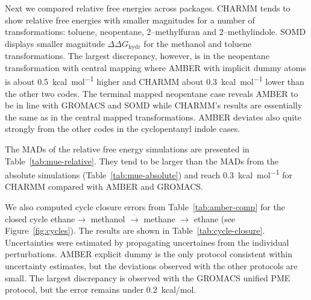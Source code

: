 \documentclass[journal=jctcce,manuscript=article]{achemso}
\begin{document}
Next we compared relative free energies across packages.
CHARMM tends to show relative free energies with smaller magnitudes for a number of transformations: toluene, neopentane, 2--methylfuran and 2--methylindole. SOMD displays smaller magnitude $\Delta\Delta G_{\mathrm{hydr}}$ for the methanol and toluene transformations.  The largest discrepancy, however, is in the neopentane transformation with central mapping where AMBER with implicit dummy atoms is about \SI{0.5}{kcal.mol^{-1}} higher and CHARMM about \SI{0.3}{kcal.mol^{-1}} lower than the other two codes.  The
terminal mapped neopentane case reveals AMBER to be in line with GROMACS and SOMD while CHARMM's results are essentially the same as in the central mapped transformations.  AMBER deviates also quite strongly from the other codes in the cyclopentanyl indole cases.

The MADs of the relative free energy simulations are presented in
Table~\ref{tab:mue-relative}.  They tend to be larger than the MADs from
the absolute simulations (Table~\ref{tab:mue-absolute}) and reach
\SI{0.3}{kcal.mol^{-1}} for CHARMM compared with AMBER and GROMACS.

\begin{table}[]
  \begin{minipage}{\linewidth}
    \caption{MAD (in \si{kcal.mol^{-1}}) comparing relative free energies from
      relative simulations between SOMD, GROMACS, AMBER and
      CHARMM.}\label{tab:mue-relative}
  \end{minipage}
\end{table}
We also computed cycle closure errors from Table~\ref{tab:amber-comp} for
the closed cycle ethane$ \rightarrow$ methanol $\rightarrow$ methane $\rightarrow$ ethane (see Figure~\ref{fig:cycles}). The results are shown in Table~\ref{tab:cycle-closure}. Uncertainties were estimated by propagating uncertaines from the individual perturbations. AMBER explicit dummy is the only protocol consistent within uncertainty estimates, but the deviations observed with the other protocols are small. The largest discrepancy is observed with the GROMACS unified PME protocol, but the error remains under \SI{0.2}{kcal/mol}.
\end{document}

